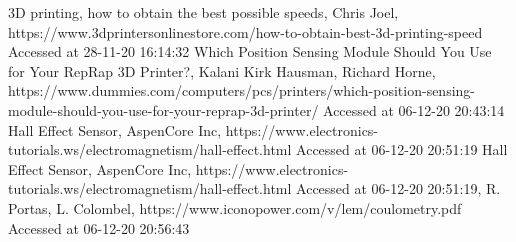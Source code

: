 \documentclass[conference]{IEEEtran}
\begin{document}
\begin{thebibliography}{00}
 3D printing, how to obtain the best possible speeds, Chris Joel, https://www.3dprintersonlinestore.com/how-to-obtain-best-3d-printing-speed Accessed at 28-11-20 16:14:32
 Which Position Sensing Module Should You Use for Your RepRap 3D Printer?, Kalani Kirk Hausman, Richard Horne, https://www.dummies.com/computers/pcs/printers/which-position-sensing-module-should-you-use-for-your-reprap-3d-printer/ Accessed at 06-12-20 20:43:14
 Hall Effect Sensor, AspenCore Inc, https://www.electronics-tutorials.ws/electromagnetism/hall-effect.html Accessed at 06-12-20 20:51:19
 Hall Effect Sensor, AspenCore Inc, https://www.electronics-tutorials.ws/electromagnetism/hall-effect.html Accessed at 06-12-20 20:51:19, R. Portas, L. Colombel, https://www.iconopower.com/v/lem/coulometry.pdf Accessed at 06-12-20 20:56:43
\end{thebibliography}
\end{document}
